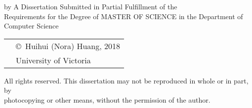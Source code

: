 \pagebreak
{
\centering
\thesistitle
\tpbreak
by
\tpbreak
\nameanddegrees
\tpbreak
A Dissertation Submitted in Partial Fulfillment of the \\
Requirements for the Degree of
\tpbreak
MASTER OF SCIENCE
\tpbreak
in the Department of Computer Science\\
\vfill
\begin{tabular}{cl}
& \copyright\ Huihui (Nora) Huang, 2018\\
& \phantom{\copyright} University of Victoria
\end{tabular}
\tpbreak
All rights reserved. This dissertation may not be reproduced in whole or in part, by \\
\hfill photocopying or other means, without the permission of the author. 
\hfill
}
\pagebreak
